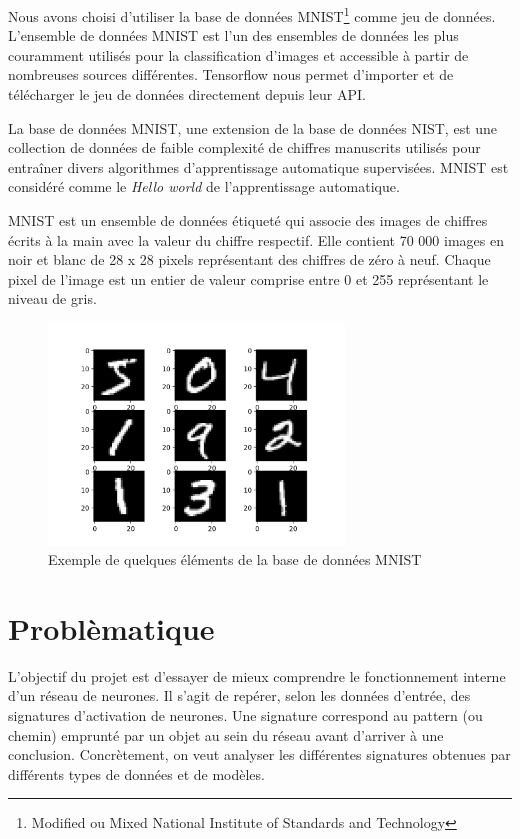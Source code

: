 \documentclass[oneside,13pt,a4paper]{report}
\begin{document}
Nous avons choisi d'utiliser la base de données MNIST\footnote{Modified ou Mixed National Institute of Standards and Technology} comme jeu de données. L'ensemble de données MNIST est l'un des ensembles de données les plus couramment utilisés pour la classification d'images et accessible à partir de nombreuses sources différentes. Tensorflow nous permet d'importer et de télécharger le jeu de données directement depuis leur API.

La base de données MNIST, une extension de la base de données NIST, est une collection de données de faible complexité de chiffres manuscrits utilisés pour entraîner divers algorithmes d'apprentissage automatique supervisées. MNIST est considéré comme le \textit{Hello world} de l'apprentissage automatique.

MNIST est un ensemble de données étiqueté qui associe des images de chiffres écrits à la main avec la valeur du chiffre respectif. Elle contient 70 000 images en noir et blanc de 28 x 28 pixels représentant des chiffres de zéro à neuf. Chaque pixel de l'image est un entier de valeur comprise entre 0 et 255 représentant le niveau de gris.

\begin{figure}[!h]
	\begin{center}
		 \includegraphics[width=0.7\textwidth]{img/mnist.png}
		 \caption{Exemple de quelques éléments de la base de données MNIST}
	\end{center}
\end{figure}

\section{Problèmatique}

L'objectif du projet est d'essayer de mieux comprendre le fonctionnement interne d'un réseau de neurones. Il s'agit de repérer, selon les données d'entrée, des signatures d'activation de neurones. Une signature correspond au pattern (ou chemin) emprunté par un objet au sein du réseau avant d'arriver à une conclusion. Concrètement, on veut analyser les différentes signatures obtenues par différents types de données et de modèles.
\end{document}
